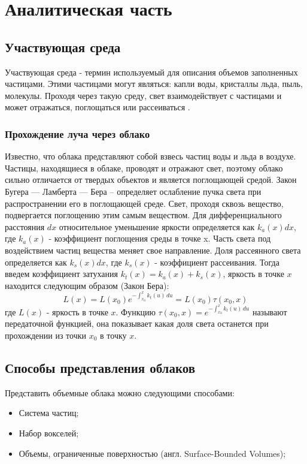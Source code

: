 \chapter{Аналитическая часть}

\section{Участвующая среда}

Участвующая среда - термин используемый для описания объемов заполненных частицами. Этими частицами могут являться: капли воды, кристаллы льда, пыль, молекулы. Проходя через такую среду, свет взаимодействует с частицами и может отражаться, поглощаться или рассеиваться \cite{frostbite}.  

\subsection{Прохождение луча через облако}
Известно, что облака представляют собой взвесь частиц воды и льда в воздухе.
Частицы, находящиеся в облаке, проводят и отражают свет, поэтому облако
сильно отличается от твердых объектов и является поглощающей средой.
Закон Бугера — Ламберта — Бера – определяет ослабление пучка света при распространении его в поглощающей среде. 
Свет, проходя сквозь вещество, подвергается поглощению этим самым веществом. Для дифференциального расстояния $ dx $ относительное уменьшение яркости определяется как $ k_a(x)dx $, где $ k_a(x) $ - коэффициент поглощения среды в точке x. Часть света под воздействием частиц вещества меняет свое направление. Доля рассеянного света определяется как $ k_s(x)dx $, где $ k_s(x) $ - коэффициент рассеивания. Тогда введем коэффициент затухания $ k_t(x)  = k_a(x) + k_s(x) $, яркость в точке $x$ находится следующим образом (Закон Бера):  
\begin{equation}
	\label{for:beers_law}
	L(x) = L(x_0) e^{-\int_{x_0}^{x} k_t(u)\,du}=L(x_0)\tau(x_0, x) 
\end{equation}
где $ L(x) $ - яркость в точке $ x $. Функцию $ \tau(x_0, x) = e^{-\int_{x_0}^{x} k_t(u)\,du}  $ называют передаточной функцией, она показывает какая доля света останется при прохождении из точки $ x_0 $ в точку $ x $.


\section{Способы представления облаков}

Представить объемные облака можно следующими способами:
\begin{itemize}
	\item Система частиц;
	\item Набор вокселей;
	\item Объемы, ограниченные поверхностью (англ. Surface-Bounded Volumes);
\end{itemize}

